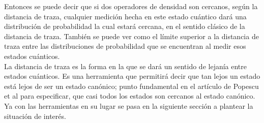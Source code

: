 Entonces se puede decir que si dos operadores de densidad son cercanos, según la distancia de traza, cualquier medición hecha en este estado cuántico dará una distribución de probabilidad la cual estará cercana, en el sentido clásico de la distancia de traza. También se puede ver como el límite superior a la distancia de traza entre las distribuciones de probabilidad que se encuentran al medir esos estados cuánticos.
\\
La distancia de traza es la forma en la que se dará un sentido de lejanía entre estados cuánticos. Es una herramienta que permitirá decir que tan lejos un estado está lejos de ser un estado canónico; punto fundamental 	en el artículo de Popescu et al para especificar, que casi todos los estados son cercanos al estado canónico. Ya con las herramientas en su lugar se pasa en la siguiente sección a plantear la situación de interés.

